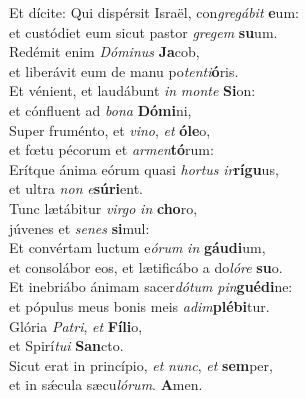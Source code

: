 \evenverse Et dícite: Qui dispérsit Israël, con\textit{gre}\textit{gá}\textit{bit} \textbf{e}um:~\*\\
\evenverse et custódiet eum sicut pastor \textit{gre}\textit{gem} \textbf{su}um.\\
\oddverse Redémit enim \textit{Dó}\textit{mi}\textit{nus} \textbf{Ja}cob,~\*\\
\oddverse et liberávit eum de manu po\textit{ten}\textit{ti}\textbf{ó}ris.\\
\evenverse Et vénient, et laudábunt \textit{in} \textit{mon}\textit{te} \textbf{Si}on:~\*\\
\evenverse et cónfluent ad \textit{bo}\textit{na} \textbf{Dó}\textbf{mi}ni,\\
\oddverse Super fruménto, et \textit{vi}\textit{no}, \textit{et} \textbf{ó}\textbf{le}o,~\*\\
\oddverse et fœtu pécorum et \textit{ar}\textit{men}\textbf{tó}rum:\\
\evenverse Erítque ánima eórum quasi \textit{hor}\textit{tus} \textit{ir}\textbf{rí}\textbf{gu}us,~\*\\
\evenverse et ultra \textit{non} \textit{e}\textbf{sú}\textbf{ri}ent.\\
\oddverse Tunc lætábitur \textit{vir}\textit{go} \textit{in} \textbf{cho}ro,~\*\\
\oddverse júvenes et \textit{se}\textit{nes} \textbf{si}mul:\\
\evenverse Et convértam luctum e\textit{ó}\textit{rum} \textit{in} \textbf{gáu}\textbf{di}um,~\*\\
\evenverse et consolábor eos, et lætificábo a do\textit{ló}\textit{re} \textbf{su}o.\\
\oddverse Et inebriábo ánimam sacer\textit{dó}\textit{tum} \textit{pin}\textbf{gué}\textbf{di}ne:~\*\\
\oddverse et pópulus meus bonis meis \textit{a}\textit{dim}\textbf{plé}\textbf{bi}tur.\\
\evenverse Glória \textit{Pa}\textit{tri}, \textit{et} \textbf{Fí}\textbf{li}o,~\*\\
\evenverse et Spirí\textit{tu}\textit{i} \textbf{San}cto.\\
\oddverse Sicut erat in princípio, \textit{et} \textit{nunc}, \textit{et} \textbf{sem}per,~\*\\
\oddverse et in sǽcula sæcu\textit{ló}\textit{rum}. \textbf{A}men.\\

